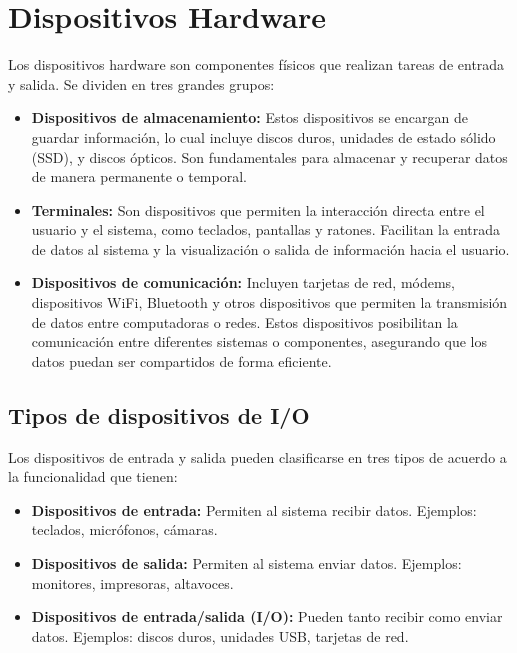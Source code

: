 \section{Dispositivos Hardware}
Los dispositivos hardware son componentes físicos que realizan tareas de entrada y salida. Se dividen en tres grandes grupos:

\begin{tcolorbox}[title= División de los dispositivos \textit{hardware}]
	\begin{itemize}
		
		
		\item \textbf{Dispositivos de almacenamiento:}
		Estos dispositivos se encargan de guardar información, lo cual incluye discos duros, unidades de estado sólido (SSD), y discos ópticos. Son fundamentales para almacenar y recuperar datos de manera permanente o temporal.
		\item \textbf{Terminales:}
		Son dispositivos que permiten la interacción directa entre el usuario y el sistema, como teclados, pantallas y ratones. Facilitan la entrada de datos al sistema y la visualización o salida de información hacia el usuario.
		\item \textbf{Dispositivos de comunicación:}
		Incluyen tarjetas de red, módems, dispositivos WiFi, Bluetooth y otros dispositivos que permiten la transmisión de datos entre computadoras o redes. Estos dispositivos posibilitan la comunicación entre diferentes sistemas o componentes, asegurando que los datos puedan ser compartidos de forma eficiente.

		
	\end{itemize}
\end{tcolorbox}
\subsection{Tipos de dispositivos de I/O}
Los dispositivos de entrada y salida pueden clasificarse en tres tipos de acuerdo a la funcionalidad que tienen:
\begin{itemize}
	\item  \textbf{Dispositivos de entrada: }Permiten al sistema recibir datos. Ejemplos: teclados, micrófonos, cámaras.
	\item \textbf{Dispositivos de salida: }Permiten al sistema enviar datos. Ejemplos: monitores, impresoras, altavoces.
	\item  \textbf{Dispositivos de entrada/salida (I/O): }Pueden tanto recibir como enviar datos. Ejemplos: discos duros, unidades USB, tarjetas de red.
\end{itemize}
\newpage
